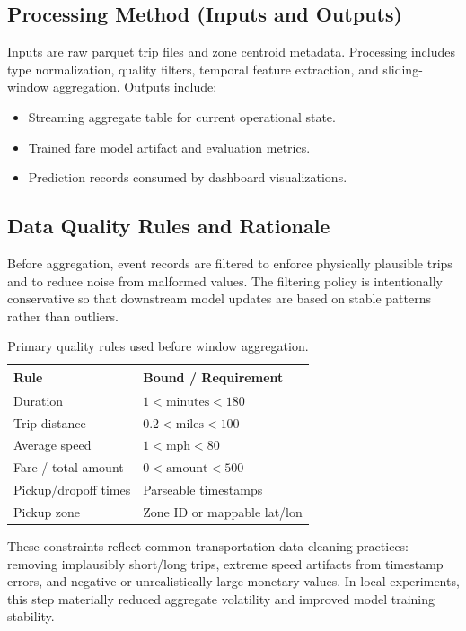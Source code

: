 \documentclass[conference]{IEEEtran}
\begin{document}
\subsection{Processing Method (Inputs and Outputs)}
Inputs are raw parquet trip files and zone centroid metadata. Processing includes type normalization, quality filters, temporal feature extraction, and sliding-window aggregation. Outputs include:
\begin{itemize}[leftmargin=1.5em]
    \item Streaming aggregate table for current operational state.
    \item Trained fare model artifact and evaluation metrics.
    \item Prediction records consumed by dashboard visualizations.
\end{itemize}

\subsection{Data Quality Rules and Rationale}
Before aggregation, event records are filtered to enforce physically plausible trips and to reduce noise from malformed values. The filtering policy is intentionally conservative so that downstream model updates are based on stable patterns rather than outliers.

\begin{table}[!t]
\centering
\begin{tabular}{ll}
\toprule
Rule & Bound / Requirement \\
\midrule
Duration & $1 < \text{minutes} < 180$ \\
Trip distance & $0.2 < \text{miles} < 100$ \\
Average speed & $1 < \text{mph} < 80$ \\
Fare / total amount & $0 < \text{amount} < 500$ \\
Pickup/dropoff times & Parseable timestamps \\
Pickup zone & Zone ID or mappable lat/lon \\
\bottomrule
\end{tabular}
\caption{Primary quality rules used before window aggregation.}\label{tab:quality_rules}
\end{table}

These constraints reflect common transportation-data cleaning practices: removing implausibly short/long trips, extreme speed artifacts from timestamp errors, and negative or unrealistically large monetary values. In local experiments, this step materially reduced aggregate volatility and improved model training stability.
\end{document}
